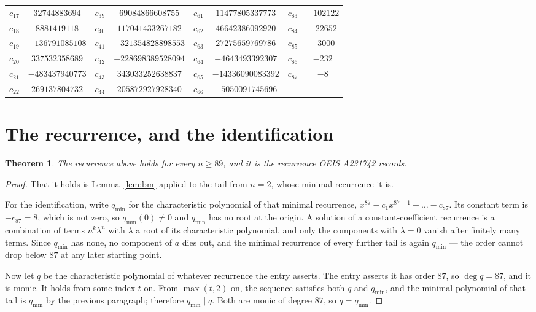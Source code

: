 \documentclass[11pt,a4paper]{article}
\theoremstyle{plain}
\newtheorem{theorem}{Theorem}
\theoremstyle{definition}
\begin{document}
\begin{center}
\begin{tabular}{cccccccc}
$c_{17}$ & $32744883694$ & $c_{39}$ & $69084866608755$ & $c_{61}$ & $11477805337773$ & $c_{83}$ & $-102122$ \\
$c_{18}$ & $8881419118$ & $c_{40}$ & $117041433267182$ & $c_{62}$ & $46642386092920$ & $c_{84}$ & $-22652$ \\
$c_{19}$ & $-136791085108$ & $c_{41}$ & $-321354828898553$ & $c_{63}$ & $27275659769786$ & $c_{85}$ & $-3000$ \\
$c_{20}$ & $337532358689$ & $c_{42}$ & $-228698389528094$ & $c_{64}$ & $-4643493392307$ & $c_{86}$ & $-232$ \\
$c_{21}$ & $-483437940773$ & $c_{43}$ & $343033252638837$ & $c_{65}$ & $-14336090083392$ & $c_{87}$ & $-8$ \\
$c_{22}$ & $269137804732$ & $c_{44}$ & $205872927928340$ & $c_{66}$ & $-5050091745696$ &  &  \\
\end{tabular}
\end{center}

\section{The recurrence, and the identification}

\begin{theorem}
The recurrence above holds for every $n\ge89$, and it is the recurrence OEIS A231742 records.
\end{theorem}

\begin{proof}
That it holds is Lemma~\ref{lem:bm} applied to the tail from $n=2$, whose minimal
recurrence it is.

For the identification, write $q_{\min}$ for the characteristic polynomial of that minimal
recurrence, $x^{87}-c_1x^{87-1}-\dots-c_{87}$. Its constant term is
$-c_{87}=8$, which is not zero, so $q_{\min}(0)\neq0$ and $q_{\min}$ has no
root at the origin. A solution of a constant-coefficient recurrence is a combination of terms
$n^{k}\lambda^{n}$ with $\lambda$ a root of its characteristic polynomial, and only the
components with $\lambda=0$ vanish after finitely many terms. Since $q_{\min}$ has none, no
component of $a$ dies out, and the minimal recurrence of every further tail is again
$q_{\min}$ --- the order cannot drop below $87$ at any later starting point.

Now let $q$ be the characteristic polynomial of whatever recurrence the entry asserts. The
entry asserts it has order $87$, so $\deg q=87$, and it is monic. It holds from some
index $t$ on. From $\max(t,2)$ on, the sequence satisfies both $q$ and $q_{\min}$, and
the minimal polynomial of that tail is $q_{\min}$ by the previous paragraph; therefore
$q_{\min}\mid q$. Both are monic of degree $87$, so $q=q_{\min}$.
\end{proof}
\end{document}

